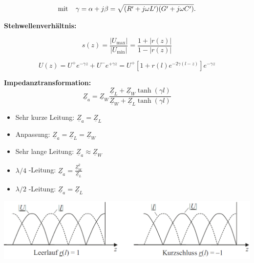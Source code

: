 \documentclass[german]{latex4ei/latex4ei_sheet}
\begin{document}
\begin{sectionbox}
\[
 \text{mit} \hspace{4mm}\gamma = \alpha + j\beta = \sqrt{(R' + j\omega L')(G' + j\omega C')}.
\]


\textbf{Stehwellenverhältnis:}

\[
s(z) = \frac{\lvert U_{\text{max}} \rvert}{\lvert U_{\text{min}} \rvert} = \frac{1 + \lvert r(z) \rvert}{1 - \lvert r(z) \rvert}
\]

\[
 U(z) = U^+ e^{-\gamma z} + U^- e^{+\gamma z} = U^+ \left[ 1 + r(l)e^{-2\gamma (l-z)} \right] e^{-\gamma z}
\]


\textbf{Impedanztransformation:}
\[
    \underline{Z}_a = \underline{Z}_W \frac{\underline{Z}_L + \underline{Z}_W \tanh (\gamma l)}{\underline{Z}_W + \underline{Z}_L \tanh (\gamma l)}
\]
\begin{itemize}
    \item Sehr kurze Leitung: $\underline{Z}_a = \underline{Z}_L$
    \item Anpassung: $\underline{Z}_a = \underline{Z}_L = \underline{Z}_W$
    \item Sehr lange Leitung: $\underline{Z}_a \approx \underline{Z}_W$
    \item $\lambda / 4$ -Leitung: $\underline{Z}_a = \frac{\underline{Z}_W^2}{\underline{Z}_L}$
    \item $\lambda / 2$ -Leitung: $\underline{Z}_a = \underline{Z}_L$

\end{itemize}
\end{sectionbox}


\includegraphics[width = \columnwidth]{images/Reflexion.png}
\end{document}
